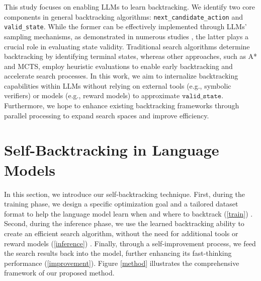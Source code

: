 \documentclass{article}
\theoremstyle{plain}
\theoremstyle{definition}
\theoremstyle{remark}
\begin{document}
This study focuses on enabling LLMs to learn backtracking. We identify two core components in general backtracking algorithms: \texttt{next\_candidate\_action} and \texttt{valid\_state}. While the former can be effectively implemented through LLMs' sampling mechanisms, as demonstrated in numerous studies \cite{feng2023alphazero,gptf}, the latter plays a crucial role in evaluating state validity. Traditional search algorithms determine backtracking by identifying terminal states, whereas other approaches, such as A* and MCTS, employ heuristic evaluations to enable early backtracking and accelerate search processes. In this work, we aim to internalize backtracking capabilities within LLMs without relying on external tools (e.g., symbolic verifiers) or models (e.g., reward models) to approximate $\texttt{valid\_state}$. Furthermore, we hope to enhance existing backtracking frameworks through parallel processing to expand search spaces and improve efficiency.


\section{Self-Backtracking in Language Models}
In this section, we introduce our self-backtracking technique. First, during the training phase, we design a specific optimization goal and a tailored dataset format to help the language model learn when and where to backtrack (\textsection \ref{train}) . Second, during the inference phase, we use the learned backtracking ability to create an efficient search algorithm, without the need for additional tools or reward models (\textsection \ref{inference}) . Finally, through a self-improvement process, we feed the search results back into the model, further enhancing its fast-thinking performance (\textsection \ref{improvement}). Figure \ref{method} illustrates the comprehensive framework of our proposed method.
\end{document}
